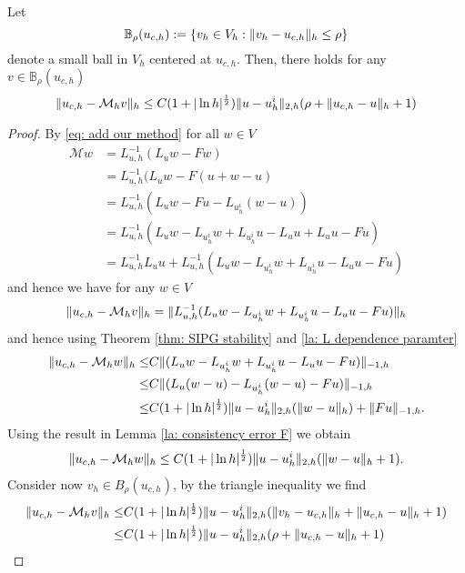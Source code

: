 \begin{lemma} \label{la: mapping property of M}
	Let 
	\[
		\mathbb B_\rho(u_{c,h}):=\{v_h \in V_h: \lVert v_h - u_{c,h} \rVert_{h} \leq \rho\}
	\]
	denote a small ball in $V_h$ centered at $u_{c,h}$. 
	Then, there holds for any $v \in \mathbb B_\rho(u_{c,h})$
	\[
		\lVert u_{c,h} - \mathcal M_h v \rVert_{h} \leq C (1+|\ln h|^{\frac 1 2}) \lVert u - u^i_h \rVert_{2,h} (\rho+ \lVert u_{c,h}-u \rVert_{h}+1)
	\] 
\end{lemma}
\begin{proof}
By \eqref{eq: add our method} for all $w \in V$
\begin{align}
	\mathcal M w &= L_{u,h}^{-1}(L_u w - Fw) \nonumber\\
				 &= L_{u,h}^{-1}(L_u w - F(u+w-u) \nonumber\\
				 &= L_{u,h}^{-1}(L_u w - Fu - L_{u^i_h} (w-u)) \nonumber\\
				 &=  L_{u,h}^{-1}(L_u w - L_{u^i_h} w + L_{u^i_h}u - L_u u + L_u u - Fu) \nonumber\\
				 & = L_{u,h}^{-1} L_u u + L_{u,h}^{-1}(L_u w - L_{u^i_h} w + L_{u^i_h}u - L_u u - Fu) \label{eq: expand M}
 \end{align}	
 and hence we have for any $w \in V$
	\begin{align}
		\lVert u_{c,h} - \mathcal M_h v \rVert_{h} = \lVert L_{u,h}^{-1}(L_u w - L_{u^i_h} w + L_{u^i_h}u - L_u u - Fu) \rVert_{h}
	\end{align}
	and hence using Theorem \ref{thm: SIPG stability} and \ref{la: L dependence paramter}
	\begin{align*}
		\lVert u_{c,h} - \mathcal M_h w \rVert_{h} 
		\leq& C\lVert (L_u w - L_{u^i_h} w + L_{u^i_h} u- L_u u - Fu) \rVert_{-1,h} \nonumber\\
		\leq& C\lVert (L_u (w-u) - L_{u^i_h} (w-u) - Fu) \rVert_{-1,h} \nonumber\\
				\leq& C (1+|\ln h|^{\frac 1 2}) \lVert u - u^i_h \rVert_{2,h} (\lVert w-u \rVert_{h}) +\lVert Fu \rVert_{-1,h}.
	\end{align*}
	Using the result in Lemma \ref{la: consistency error F} we obtain
	\begin{align*}
		\lVert u_{c,h} - \mathcal M_h w \rVert_{h} \leq C (1+|\ln h|^{\frac 1 2}) \lVert u - u^i_h \rVert_{2,h} (\lVert w-u \rVert_{h}+1).
	\end{align*}
	Consider now $v_h \in B_\rho(u_{c,h})$, by the triangle inequality we find 
	\begin{align}
		\lVert u_{c,h} - \mathcal M_h v \rVert_{h} 
			\leq& C (1+|\ln h|^{\frac 1 2}) \lVert u - u^i_h \rVert_{2,h} (\lVert v_h-u_{c,h} \rVert_{h}+ \lVert u_{c,h}-u \rVert_{h} +1) \nonumber \\
			\leq& C (1+|\ln h|^{\frac 1 2}) \lVert u - u^i_h \rVert_{2,h} (\rho+ \lVert u_{c,h}-u \rVert_{h} +1)			
	\end{align}
\end{proof}

